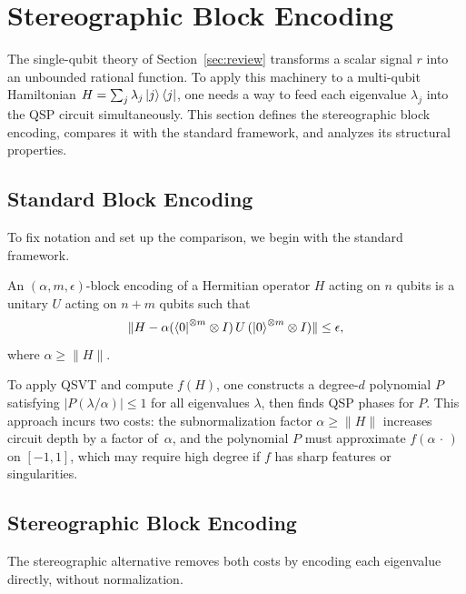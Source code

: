 \section{Stereographic Block Encoding}
\label{sec:block-encoding}

The single-qubit theory of
Section~\ref{sec:review} transforms a scalar signal $r$ into
an unbounded rational function.  To apply this machinery to a
multi-qubit Hamiltonian
$H = \sum_j \lambda_j\ket{j}\bra{j}$, one needs a way to feed
each eigenvalue $\lambda_j$ into the QSP circuit
simultaneously.  This section defines the stereographic block
encoding, compares it with the standard framework, and analyzes
its structural properties.

\subsection{Standard Block Encoding}
\label{subsec:standard-block}

To fix notation and set up the comparison, we begin with the
standard framework.

\begin{definition}
	\label{def:standard-block}
	An $(\alpha, m, \epsilon)$-block encoding of a Hermitian
	operator $H$ acting on $n$ qubits is a unitary $U$ acting
	on $n + m$ qubits such that
	\begin{equation}
		\|H - \alpha(\bra{0}^{\otimes m} \otimes I)\, U\,
		(\ket{0}^{\otimes m} \otimes I)\| \leq \epsilon,
		\label{eq:standard-block}
	\end{equation}
	where $\alpha \geq \|H\|$.
\end{definition}

To apply QSVT and compute $f(H)$, one constructs a degree-$d$
polynomial $P$ satisfying $|P(\lambda/\alpha)| \leq 1$ for all
eigenvalues $\lambda$, then finds QSP phases for $P$.  This
approach incurs two costs: the subnormalization factor
$\alpha \geq \|H\|$ increases circuit depth by a factor
of~$\alpha$, and the polynomial $P$ must approximate
$f(\alpha\,\cdot\,)$ on $[-1,1]$, which may require high
degree if $f$ has sharp features or singularities.

\subsection{Stereographic Block Encoding}
\label{subsec:stereo-block}

The stereographic alternative removes both costs by encoding
each eigenvalue directly, without normalization.

